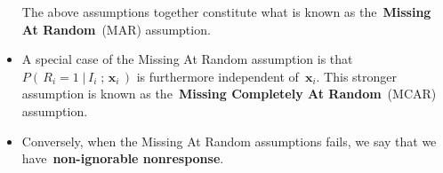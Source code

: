 \begin{remark}
\begin{itemize}
	The above assumptions together constitute what is known as the
	\,\textbf{Missing At Random}\, (MAR) assumption.
\item
	A special case of the Missing At Random assumption is that
	$P(\,R_{i} = 1\;\vert\,I_{i}\;;\,_{i}\,)$ is furthermore independent of
	\,$_{i}$.
	This stronger assumption is known as the
	\,\textbf{Missing Completely At Random}\, (MCAR) assumption.
\item
	Conversely, when the Missing At Random assumptions fails,
	we say that we have \,\textbf{non-ignorable nonresponse}.
\end{itemize}
\end{remark}


